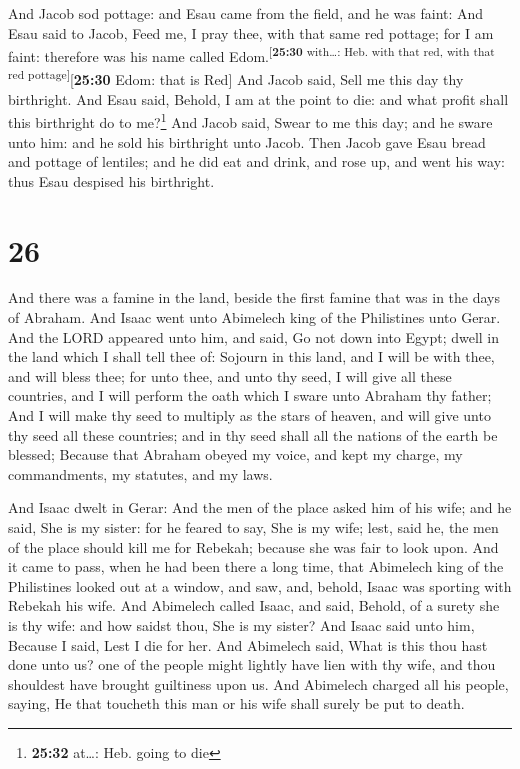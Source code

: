  And Jacob sod pottage: and Esau came from the field, and
he was faint:  And Esau said to Jacob, Feed me, I pray
thee, with that same red pottage; for I am faint: therefore was his name
called Edom.\textsuperscript{{[}\textbf{25:30} with\ldots: Heb. with
that red, with that red pottage{]}}{[}\textbf{25:30} Edom: that is
Red{]}  And Jacob said, Sell me this day thy birthright.
 And Esau said, Behold, I am at the point to die: and
what profit shall this birthright do to me?\footnote{\textbf{25:32}
  at\ldots: Heb. going to die}  And Jacob said, Swear to
me this day; and he sware unto him: and he sold his birthright unto
Jacob.  Then Jacob gave Esau bread and pottage of
lentiles; and he did eat and drink, and rose up, and went his way: thus
Esau despised his birthright.

\hypertarget{section-25}{%
\section{26}\label{section-25}}

 And there was a famine in the land, beside the first
famine that was in the days of Abraham. And Isaac went unto Abimelech
king of the Philistines unto Gerar.  And the LORD appeared
unto him, and said, Go not down into Egypt; dwell in the land which I
shall tell thee of:  Sojourn in this land, and I will be
with thee, and will bless thee; for unto thee, and unto thy seed, I will
give all these countries, and I will perform the oath which I sware unto
Abraham thy father;  And I will make thy seed to multiply
as the stars of heaven, and will give unto thy seed all these countries;
and in thy seed shall all the nations of the earth be blessed;
 Because that Abraham obeyed my voice, and kept my charge,
my commandments, my statutes, and my laws.

 And Isaac dwelt in Gerar:  And the men of
the place asked him of his wife; and he said, She is my sister: for he
feared to say, She is my wife; lest, said he, the men of the place
should kill me for Rebekah; because she was fair to look upon.
 And it came to pass, when he had been there a long time,
that Abimelech king of the Philistines looked out at a window, and saw,
and, behold, Isaac was sporting with Rebekah his wife. 
And Abimelech called Isaac, and said, Behold, of a surety she is thy
wife: and how saidst thou, She is my sister? And Isaac said unto him,
Because I said, Lest I die for her.  And Abimelech said,
What is this thou hast done unto us? one of the people might lightly
have lien with thy wife, and thou shouldest have brought guiltiness upon
us.  And Abimelech charged all his people, saying, He
that toucheth this man or his wife shall surely be put to death.

